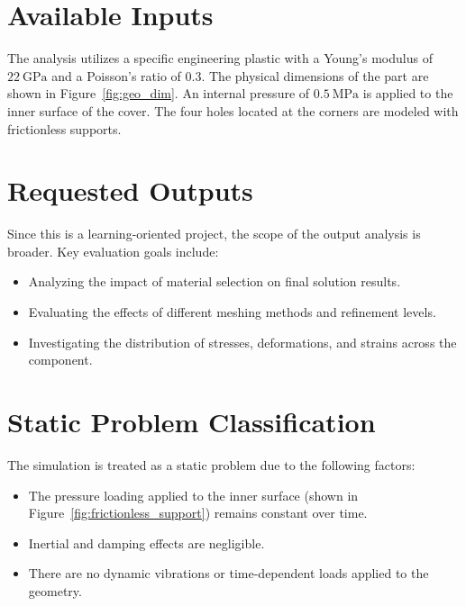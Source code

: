 \documentclass[12pt, a4paper]{article}
\begin{document}
	
	\section{Available Inputs}
	
	The analysis utilizes a specific engineering plastic with a Young's modulus of $22~\text{GPa}$ and a Poisson's ratio of $0.3$. The physical dimensions of the part are shown in Figure~\ref{fig:geo_dim}. An internal pressure of $0.5~\text{MPa}$ is applied to the inner surface of the cover. The four holes located at the corners are modeled with frictionless supports.
	
	
	\section{Requested Outputs}
	
	Since this is a learning-oriented project, the scope of the output analysis is broader. Key evaluation goals include:
	\begin{itemize}
		\item Analyzing the impact of material selection on final solution results.
		\item Evaluating the effects of different meshing methods and refinement levels.
		\item Investigating the distribution of stresses, deformations, and strains across the component.
	\end{itemize}
	
	
	\section{Static Problem Classification}
	
	The simulation is treated as a static problem due to the following factors:
	\begin{itemize}
		\item The pressure loading applied to the inner surface (shown in Figure~\ref{fig:frictionless_support}) remains constant over time.
		\item Inertial and damping effects are negligible.
		\item There are no dynamic vibrations or time-dependent loads applied to the geometry.
	\end{itemize}
	
\end{document}
